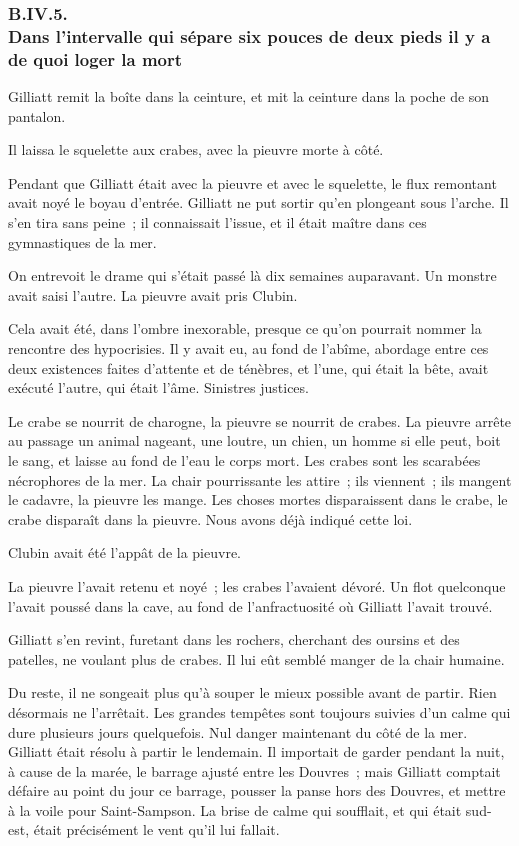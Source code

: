 \documentclass[french,twoside]{book} %
\begin{document}
 \subsubsection[{B.IV.5. Dans l’intervalle qui sépare six pouces de deux pieds il y a de quoi loger la mort}]{B.IV.5. \\
Dans l’intervalle qui sépare six pouces de deux pieds il y a de quoi loger la mort}
\noindent Gilliatt remit la boîte dans la ceinture, et mit la ceinture dans la poche de son pantalon.\par
Il laissa le squelette aux crabes, avec la pieuvre morte à côté.\par
Pendant que Gilliatt était avec la pieuvre et avec le squelette, le flux remontant avait noyé le boyau d’entrée. Gilliatt ne put sortir qu’en plongeant sous l’arche. Il s’en tira sans peine ; il connaissait l’issue, et il était maître dans ces gymnastiques de la mer.\par
On entrevoit le drame qui s’était passé là dix semaines auparavant. Un monstre avait saisi l’autre. La pieuvre avait pris Clubin.\par
Cela avait été, dans l’ombre inexorable, presque ce qu’on pourrait nommer la rencontre des hypocrisies. Il y avait eu, au fond de l’abîme, abordage entre ces deux existences faites d’attente et de ténèbres, et l’une, qui était la bête, avait exécuté l’autre, qui était l’âme. Sinistres justices.\par
 Le crabe se nourrit de charogne, la pieuvre se nourrit de crabes. La pieuvre arrête au passage un animal nageant, une loutre, un chien, un homme si elle peut, boit le sang, et laisse au fond de l’eau le corps mort. Les crabes sont les scarabées nécrophores de la mer. La chair pourrissante les attire ; ils viennent ; ils mangent le cadavre, la pieuvre les mange. Les choses mortes disparaissent dans le crabe, le crabe disparaît dans la pieuvre. Nous avons déjà indiqué cette loi.\par
Clubin avait été l’appât de la pieuvre.\par
La pieuvre l’avait retenu et noyé ; les crabes l’avaient dévoré. Un flot quelconque l’avait poussé dans la cave, au fond de l’anfractuosité où Gilliatt l’avait trouvé.\par
Gilliatt s’en revint, furetant dans les rochers, cherchant des oursins et des patelles, ne voulant plus de crabes. Il lui eût semblé manger de la chair humaine.\par
Du reste, il ne songeait plus qu’à souper le mieux possible avant de partir. Rien désormais ne l’arrêtait. Les grandes tempêtes sont toujours suivies d’un calme qui dure plusieurs jours quelquefois. Nul danger maintenant du côté de la mer. Gilliatt était résolu à partir le lendemain. Il importait de garder pendant la nuit, à cause de la marée, le barrage ajusté entre les Douvres ; mais Gilliatt comptait défaire au point du jour ce barrage, pousser la panse hors des Douvres, et mettre à la voile pour Saint-Sampson. La brise de calme qui soufflait, et qui était sud-est, était précisément le vent qu’il lui fallait.\par
\end{document}

